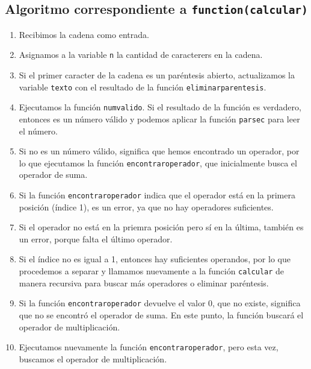 \documentclass{article}
\begin{document}
\subsection{Algoritmo correspondiente a \texttt{function(calcular)}}
\begin{enumerate}
    \item Recibimos la cadena como entrada.

    \item Asignamos a la variable \texttt{n} la cantidad de caracterers en la cadena. 

    \item Si el primer caracter de la cadena es un paréntesis abierto, actualizamos la variable \texttt{texto} con el resultado de la función \texttt{eliminar\textunderscore parentesis}.

    \item Ejecutamos la función \texttt{num\textunderscore valido}. Si el resultado de la función es verdadero, entonces es un número válido y podemos aplicar la función \texttt{parsec} para leer el número. 

    \item Si no es un número válido, significa que hemos encontrado un operador, por lo que ejecutamos la función \texttt{encontrar\textunderscore operador}, que inicialmente busca el operador de suma.

    \item Si la función \texttt{encontrar\textunderscore operador} indica que el operador está en la primera posición (índice 1), es un error, ya que no hay operadores suficientes.

    \item Si el operador no está en la priemra posición pero sí en la última, también es un error, porque falta el último operador.

    \item Si el índice no es igual a 1, entonces hay suficientes operandos, por lo que procedemos a separar y llamamos nuevamente a la función \texttt{calcular} de manera recursiva para buscar más operadores o eliminar paréntesis.

    \item Si la función \texttt{encontrar\textunderscore operador} devuelve el valor 0, que no existe, significa que no se encontró el operador de suma. En este punto, la función buscará el operador de multiplicación. 

    \item Ejecutamos nuevamente la función \texttt{encontrar\textunderscore operador}, pero esta vez, buscamos el operador de multiplicación. 


\end{enumerate}
\end{document}
